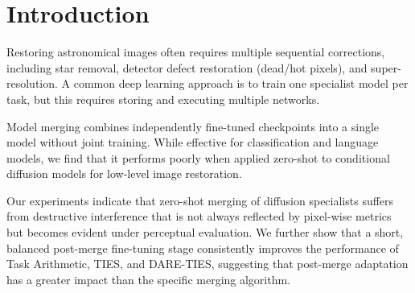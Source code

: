 \documentclass{article}
\begin{document}
\section{Introduction}
\label{sec:intro}

%

Restoring astronomical images often requires multiple sequential corrections, including star removal, detector defect restoration (dead/hot pixels), and super-resolution. A common deep learning approach is to train one specialist model per task, but this requires storing and executing multiple networks.

Model merging combines independently fine-tuned checkpoints into a single model without joint training. While effective for classification and language models, we find that it performs poorly when applied zero-shot to conditional diffusion models for low-level image restoration.

Our experiments indicate that zero-shot merging of diffusion specialists suffers from destructive interference that is not always reflected by pixel-wise metrics but becomes evident under perceptual evaluation. We further show that a short, balanced post-merge fine-tuning stage consistently improves the performance of Task Arithmetic, TIES, and DARE-TIES, suggesting that post-merge adaptation has a greater impact than the specific merging algorithm.
\end{document}
